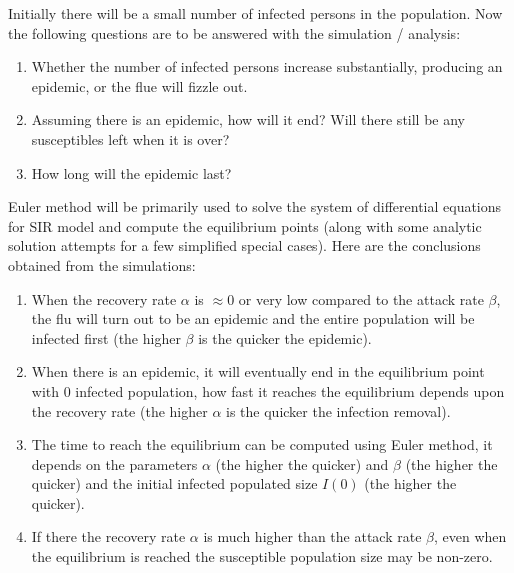 \documentclass[11pt, a4paper, twoside]{report}
\begin{document}
Initially there will be a small number of infected persons in the population. Now the following questions are to be answered with the simulation / analysis:

\begin{enumerate}
\item Whether the number of infected persons increase substantially, producing an epidemic, or the flue will fizzle out. 
\item Assuming there is an epidemic, how will it end? Will there still be any susceptibles left when it is over? 
\item How long will the epidemic last?
\end{enumerate}

Euler method will be primarily used to solve the system of differential equations for SIR model and compute the equilibrium points (along with some analytic solution attempts for a few simplified special cases). Here are the conclusions obtained from the simulations:

\begin{enumerate}
\item When the recovery rate $\alpha$ is $\approx 0$ or very low compared to the attack rate $\beta$, the flu will turn out to be an epidemic and the entire population will be infected first (the higher $\beta$ is the quicker the epidemic). 
\item When there is an epidemic, it will eventually end in the equilibrium point with $0$ infected population, how fast it reaches the equilibrium depends upon the recovery rate (the higher $\alpha$ is the quicker the infection removal).
\item The time to reach the equilibrium can be computed using Euler method, it depends on the parameters $\alpha$ (the higher the quicker) and $\beta$ (the higher the quicker) and the initial infected populated size $I(0)$ (the higher the quicker).
\item If there the recovery rate $\alpha$ is much higher than the attack rate  $\beta$, even when the equilibrium is reached the susceptible population size may be non-zero. 
\end{enumerate}



\newpage
\tableofcontents %

\end{document}
